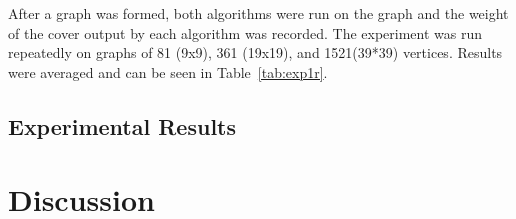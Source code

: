 After a graph was formed, both algorithms were run on the graph and the weight of the cover output by each algorithm was recorded. The experiment was run repeatedly on graphs of 81 (9x9), 361 (19x19), and 1521(39*39) vertices. Results were averaged and can be seen in Table~\ref{tab:exp1r}.  

\subsection{Experimental Results}
\label{sub:exp-results}

\section{Discussion}
\label{sec:discuss}

